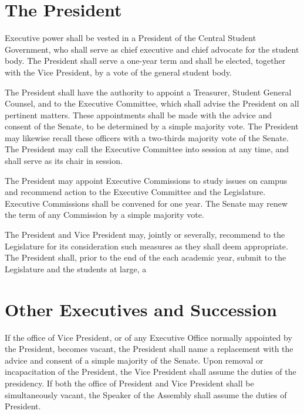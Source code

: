 
\section{The President}
    Executive power shall be vested in a President of the Central Student Government, who shall serve as chief executive and chief advocate for the student body. The President shall serve a one-year term and shall be elected, together with the Vice President, by a vote of the general student body.

    The President shall have the authority to appoint a Treasurer, Student General Counsel, and  to the Executive Committee, which shall advise the President on all pertinent matters. These appointments shall be made with the advice and consent of the Senate, to be determined by a simple majority vote. The President may likewise recall these officers with a two-thirds majority vote of the Senate. The President may call the Executive Committee into session at any time, and shall serve as its chair in session. 
    
    The President may appoint Executive Commissions to study issues on campus and recommend action to the Executive Committee and the Legislature. Executive Commissions shall be convened for one year. The Senate may renew the term of any Commission by a simple majority vote.

    The President and Vice President may, jointly or severally, recommend to the Legislature for its consideration such measures as they shall deem appropriate. The President shall, prior to the end of the each academic year, submit to the Legislature and the students at large, a 


\section{Other Executives and Succession}


    If the office of Vice President, or of any Executive Office normally appointed by the President, becomes vacant, the President shall name a replacement with the advice and consent of a simple majority of the Senate. Upon removal or incapacitation of the President, the Vice President shall assume the duties of the presidency. If both the office of President and Vice President shall be simultaneously vacant, the Speaker of the Assembly shall assume the duties of President.
